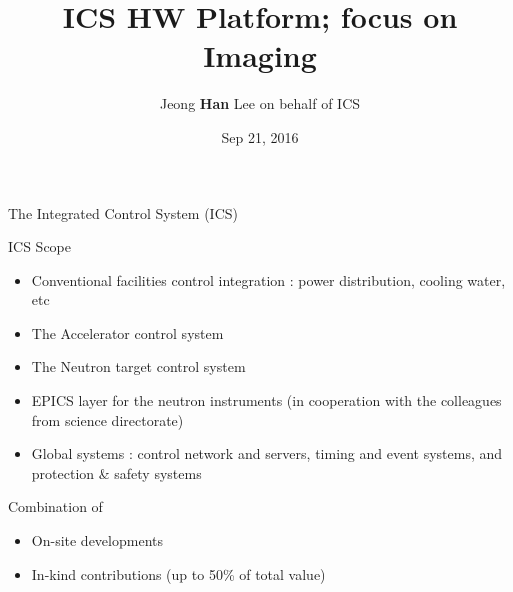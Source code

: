 \documentclass[
  9pt
  , table
  , ignorenonframetext
]{beamer}
\title{ICS HW Platform; focus on Imaging}
\author{Jeong \textbf{Han} Lee on behalf of ICS}%
\institute{
  Integrated Control System Division\\
  \textbf{ESS}, Sweden
}
\date{Sep 21, 2016}
\begin{document}
 
\begin{frame}[plain]
  \titlepage
\end{frame}


\begin{frame}{The Integrated Control System (ICS)}
  \begin{block}{ICS Scope}
    \begin{itemize}
    \item Conventional facilities control integration : power distribution, cooling water, etc
    \item The Accelerator control system
    \item The Neutron target control system
    \item EPICS layer for the neutron instruments (in cooperation with the colleagues from science directorate)
    \item Global systems : control network and servers, timing and event systems, and protection \& safety systems
    \end{itemize}
  \end{block}
  \begin{exampleblock}{Combination of}
    \begin{itemize}
    \item On-site developments 
    \item In-kind contributions (up to 50\% of total value)
    \end{itemize}
  \end{exampleblock}
\end{frame}
\end{document}
